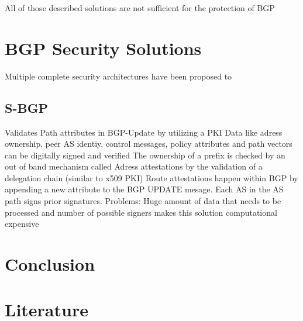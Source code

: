 \documentclass[12pt]{IEEEtran}
\begin{document}
       
       
       		
       			
	All of those described solutions are not sufficient for the protection of BGP

       \section{BGP Security Solutions}

       Multiple complete security architectures have been proposed to 
       \subsection{S-BGP}
			Validates Path attributes in BGP-Update by utilizing a PKI
			Data like adress ownership, peer AS identiy, control messages, policy attributes and path vectors can be digitally signed and verified
			The ownership of a prefix is checked by an out of band mechanism called Adress attestations by the validation of a delegation chain (similar to x509 PKI)
			Route attestations happen within BGP by appending a new attribute to the BGP UPDATE mesage. Each AS in the AS path signs prior signatures.
			Problems: 
				Huge amount of data that needs to be processed and number of possible signers makes this solution computational expensive
				
	\section{Conclusion}				

	
	\section{Literature}
\end{document}
